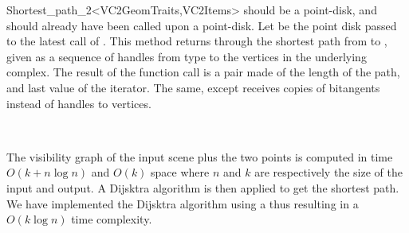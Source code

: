 \begin{ccRefClass}{Shortest_path_2<VC2GeomTraits,VC2Items>}
{ should be a point-disk, and  should
already have been called upon a point-disk. Let  be the point disk
passed to the latest call of . This method returns
through  the shortest path from  to , given as a
sequence of handles from type 
to the vertices in the underlying complex. 
The result of the function call is a pair made of the
length of the path, and last value of the iterator.}
{The same, except  receives copies of bitangents instead of
handles to vertices.}


\ccSeeAlso

\\

\ccImplementation

The visibility graph of the input scene plus the two points is computed in
time $O(k + n \log n)$ and $O(k)$ space where $n$ and $k$ are respectively
the size of the input and output.  A Dijsktra algorithm is then applied to
get the shortest path. We have implemented the Dijsktra algorithm using a
 thus resulting in a $O(k \log n)$ time complexity.


\ccTagDefaults
\end{ccRefClass}
\ccRefPageEnd

